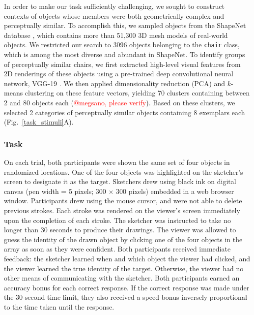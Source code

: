 \documentclass[10pt,letterpaper]{article}
\newcommand{\red}[1]{\textcolor{Red}{#1}}
\begin{document}
In order to make our task sufficiently challenging, we sought to construct contexts of objects whose members were both geometrically complex and perceptually similar.
To accomplish this, we sampled objects from the ShapeNet database \cite{chang2015shapenet}, which contains more than 51,300 3D mesh models of real-world objects. %
We restricted our search to 3096 objects belonging to the \texttt{chair} class, which is among the most diverse and abundant in ShapeNet.
To identify groups of perceptually similar chairs, we first extracted high-level visual features from 2D renderings of these objects using a pre-trained deep convolutional neural network, VGG-19 \cite{simonyan2014very}.
We then applied dimensionality reduction (PCA) and $k$-means clustering on these feature vectors, yielding 70 clusters containing between 2 and 80 objects each (\red{@megsano, please verify}).
Based on these clusters, we selected 2 categories of perceptually similar objects containing 8 exemplars each (Fig.~\ref{task_stimuli}A).

\subsubsection{Task}

On each trial, both participants were shown the same set of four objects in randomized locations.
One of the four objects was highlighted on the sketcher's screen to designate it as the target.
Sketchers drew using black ink on digital canvas (pen width = 5 pixels; 300 $\times$ 300 pixels) embedded in a web browser window.
Participants drew using the mouse cursor, and were not able to delete previous strokes.
Each stroke was rendered on the viewer's screen immediately upon the completion of each stroke.
The sketcher was instructed to take no longer than 30 seconds to produce their drawings.
The viewer was allowed to guess the identity of the drawn object by clicking one of the four objects in the array as soon as they were confident.
Both participants received immediate feedback: the sketcher learned when and which object the viewer had clicked, and the viewer learned the true identity of the target.
Otherwise, the viewer had no other means of communicating with the sketcher.
Both participants earned an accuracy bonus for each correct response.
If the correct response was made under the 30-second time limit, they also received a speed bonus inversely proportional to the time taken until the response.
\end{document}
